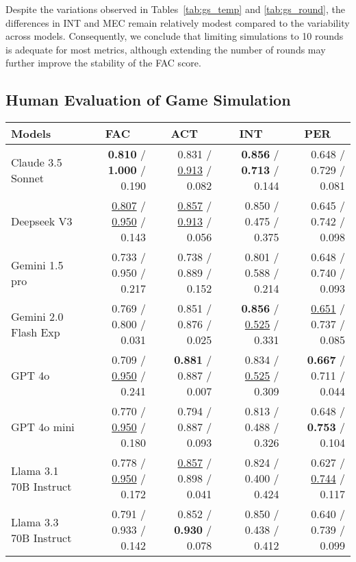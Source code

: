 Despite the variations observed in Tables~\ref{tab:gs_temp} and \ref{tab:gs_round}, the differences in INT and MEC remain relatively modest compared to the variability across models. Consequently, we conclude that limiting simulations to 10 rounds is adequate for most metrics, although extending the number of rounds may further improve the stability of the FAC score.

\subsection{Human Evaluation of Game Simulation} 
\begin{table*}[!ht]
\centering
\begin{tabular}{lrrrr}
\toprule
Models  & \multicolumn{1}{c}{FAC} & \multicolumn{1}{c}{ACT} & \multicolumn{1}{c}{INT} & \multicolumn{1}{c}{PER}  \\ 
\midrule
Claude 3.5 Sonnet & \textbf{0.810} / \textbf{1.000} / 0.190 & 0.831 / \underline{0.913} / 0.082 & \textbf{0.856} / \textbf{0.713} / 0.144 & 0.648 / 0.729 / 0.081 \\
Deepseek V3& \underline{0.807} / \underline{0.950} / 0.143 & \underline{0.857} / \underline{0.913} / 0.056 & 0.850 / 0.475 / 0.375 & 0.645 / 0.742 / 0.098 \\
Gemini 1.5 pro & 0.733 / 0.950 / 0.217 & 0.738 / 0.889 / 0.152 & 0.801 / 0.588 / 0.214 & 0.648 / 0.740 / 0.093\\
Gemini 2.0 Flash Exp & 0.769 / 0.800 / 0.031 & 0.851 / 0.876 / 0.025 & \textbf{0.856} / \underline{0.525} / 0.331 & \underline{0.651} / 0.737 / 0.085 \\
GPT 4o & 0.709 / \underline{0.950} / 0.241 & \textbf{0.881} / 0.887 / 0.007 & 0.834 / \underline{0.525} / 0.309 & \textbf{0.667} / 0.711 / 0.044 \\
GPT 4o mini & 0.770 / \underline{0.950} / 0.180 & 0.794 / 0.887 / 0.093 & 0.813 / 0.488 / 0.326 & 0.648 / \textbf{0.753} / 0.104 \\
Llama 3.1 70B Instruct & 0.778 / \underline{0.950} / 0.172 & \underline{0.857} / 0.898 / 0.041 & 0.824 / 0.400 / 0.424 & 0.627 / \underline{0.744} / 0.117 \\
Llama 3.3 70B Instruct & 0.791 / 0.933 / 0.142 & 0.852 / \textbf{0.930} / 0.078 & 0.850 / 0.438 / 0.412 & 0.640 / 0.739 / 0.099 \\
\bottomrule

\end{tabular}
\end{table*}
